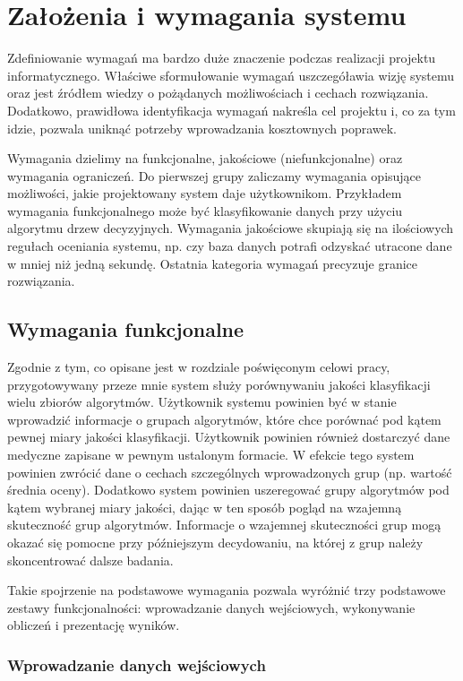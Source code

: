\documentclass[../thesis.tex]{subfiles}
\begin{document}
\pagestyle{plain}

\chapter{Założenia i wymagania systemu}

Zdefiniowanie wymagań ma bardzo duże znaczenie podczas realizacji projektu informatycznego. Właściwe sformułowanie wymagań uszczegóławia wizję systemu oraz jest źródłem wiedzy o pożądanych możliwościach i cechach rozwiązania. Dodatkowo, prawidłowa identyfikacja wymagań nakreśla cel projektu i, co za tym idzie, pozwala uniknąć potrzeby wprowadzania kosztownych poprawek.

Wymagania dzielimy na funkcjonalne, jakościowe (niefunkcjonalne) oraz wymagania ograniczeń. Do pierwszej grupy zaliczamy wymagania opisujące możliwości, jakie projektowany system daje użytkownikom. Przykładem wymagania funkcjonalnego może być klasyfikowanie danych przy użyciu algorytmu drzew decyzyjnych. Wymagania jakościowe skupiają się na ilościowych regułach oceniania systemu, np. czy baza danych potrafi odzyskać utracone dane w mniej niż jedną sekundę. Ostatnia kategoria wymagań precyzuje granice rozwiązania. 

\section{Wymagania funkcjonalne}

Zgodnie z tym, co opisane jest w rozdziale poświęconym celowi pracy, przygotowywany przeze mnie system służy porównywaniu jakości klasyfikacji wielu zbiorów algorytmów. Użytkownik systemu powinien być w stanie wprowadzić informacje o grupach algorytmów, które chce porównać pod kątem pewnej miary jakości klasyfikacji. Użytkownik powinien również dostarczyć dane medyczne zapisane w pewnym ustalonym formacie. W efekcie tego system powinien zwrócić dane o cechach szczególnych wprowadzonych grup (np. wartość średnia oceny). Dodatkowo system powinien uszeregować grupy algorytmów pod kątem wybranej miary jakości, dając w ten sposób pogląd na wzajemną skuteczność grup algorytmów. Informacje o wzajemnej skuteczności grup mogą okazać się pomocne przy późniejszym decydowaniu, na której z grup należy skoncentrować dalsze badania.

Takie spojrzenie na podstawowe wymagania pozwala wyróżnić trzy podstawowe zestawy funkcjonalności: wprowadzanie danych wejściowych, wykonywanie obliczeń i prezentację wyników.

\subsection{Wprowadzanie danych wejściowych}
\label{req:input}
\end{document}
